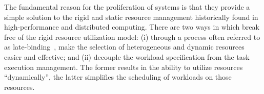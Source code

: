 \documentclass{sig-alternate}
\begin{document}




The fundamental reason for the proliferation of \pilotjob systems is that they
provide a simple solution to the rigid and static resource management
historically found in high-performance and distributed computing.  There are two
ways in which \pilotjobs break free of the rigid resource utilization model: (i)
through a process often referred to as
late-binding~\cite{moscicki2011,glatard2010,delgado2014}, \pilotjobs make the
selection of heterogeneous and dynamic resources easier and effective; and (ii)
\pilotjobs decouple the workload specification from the task execution
management.  The former results in the ability to utilize resources
``dynamically'', the latter simplifies the scheduling of workloads on those
resources.


\end{document}

